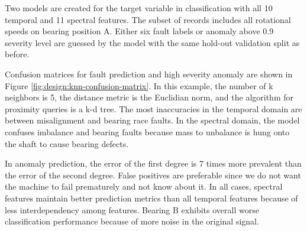 Two models are created for the target variable in classification with all 10 temporal and 11 spectral features. The subset of records includes all rotational speeds on bearing position A. Either six fault labels or anomaly above 0.9 severity level are guessed by the model with the same hold-out validation split as before. 

Confusion matrices for fault prediction and high severity anomaly are shown in Figure \ref{fig:design:knn-confusion-matrix}. In this example, the number of k neighbors is 5, the distance metric is the Euclidian norm, and the algorithm for proximity queries is a k-d tree. The most inaccuracies in the temporal domain are between misalignment and bearing race faults. In the spectral domain, the model confuses imbalance and bearing faults because mass to unbalance is hung onto the shaft to cause bearing defects. 

In anomaly prediction, the error of the first degree is 7 times more prevalent than the error of the second degree. False positives are preferable since we do not want the machine to fail prematurely and not know about it. In all cases, spectral features maintain better prediction metrics than all temporal features because of less interdependency among features. Bearing B exhibits overall worse classification performance because of more noise in the original signal.

